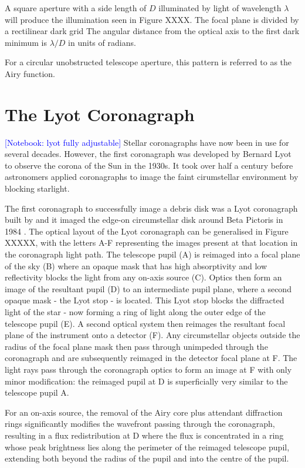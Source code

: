 \documentclass[letterpaper]{ar-1col}
\newcommand{\notebooksuggestion}[1]{\textcolor{blue}{[Notebook: #1]}}
\begin{document}
A square aperture with a side length of $D$ illuminated by light of wavelength $\lambda$ will produce the illumination seen in Figure XXXX.
%
The focal plane is divided by a rectilinear dark grid
%
The angular distance from the optical axis to the first dark minimum is $\lambda/D$ in units of radians.

For a circular unobstructed telescope aperture, this pattern is referred to as the Airy function.

\section{The Lyot Coronagraph}

\notebooksuggestion{lyot fully adjustable}
Stellar coronagraphs have now been in use for several decades. However, the first coronagraph was developed by Bernard Lyot to observe the corona of the Sun in the 1930s. It took over half a century before astronomers applied coronagraphs to image the faint cirumstellar environment by blocking starlight. 

The first coronagraph to successfully image a debris disk was a Lyot coronagraph built by \citet{Vilas87} and it imaged the edge-on circumstellar disk around Beta Pictoris in 1984 \citep{Smith84}.
%
The optical layout of the Lyot coronagraph can be generalised in Figure XXXXX, with the letters A-F representing the images present at that location in the coronagraph light path.
%
The telescope pupil (A) is reimaged into a focal plane of the sky (B) where an opaque mask that has high absorptivity and low reflectivity blocks the light from any on-axis source (C).
%
Optics then form an image of the resultant pupil (D) to an intermediate pupil plane, where a second opaque mask - the Lyot stop - is located.
%
This Lyot stop blocks the diffracted light of the star - now forming a ring of light along the outer edge of the telescope pupil (E).
%
A second optical system then reimages the resultant focal plane of the instrument onto a detector (F).
%
%
Any circumstellar objects outside the radius of the focal plane mask then pass through unimpeded through the coronagraph and are subsequently reimaged in the detector focal plane at F.
%
The light rays pass through the coronagraph optics to form an image at F with only minor modification: the reimaged pupil at D is superficially very similar to the telescope pupil A.

For an on-axis source, the removal of the Airy core plus attendant diffraction rings significantly modifies the wavefront passing through the coronagraph, resulting in a flux redistribution at D where the flux is concentrated in a ring whose peak brightness lies along the perimeter of the reimaged telescope pupil, extending both beyond the radius of the pupil and into the centre of the pupil.
\end{document}
